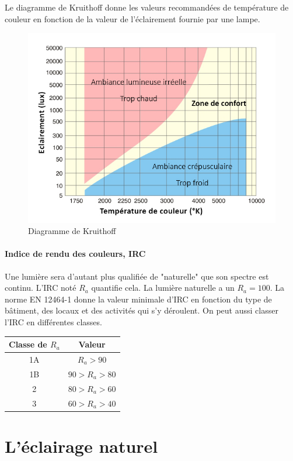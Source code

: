 \documentclass[11pt]{report}
\begin{document}
Le diagramme de Kruithoff donne les valeurs recommandées de température de couleur en fonction de la valeur de l'éclairement fournie par une lampe.


\begin{figure}[h]
\centering
\includegraphics[width=0.4\linewidth]{krui}
\caption{Diagramme de Kruithoff}
\end{figure}

\subsubsection{Indice de rendu des couleurs, IRC}
\label{irc}
Une lumière sera d'autant plus qualifiée de "naturelle" que son spectre est continu. L'IRC noté $R_a$ quantifie cela. La lumière naturelle a un $R_a=100$. La norme EN 12464-1 donne la valeur minimale d'IRC en fonction du type de bâtiment, des locaux et des activités qui s'y déroulent. On peut aussi classer l'IRC en différentes classes.

\begin{center}
\begin{tabular}{cc}
\textbf{Classe de $R_a$} & \textbf{Valeur}\\
\hline
1A & $R_a > 90$\\
1B & $90 > R_a > 80$\\
2 & $80 > R_a > 60$\\
3 & $60 > R_a > 40$\\
\end{tabular}
\end{center}















\chapter{L'éclairage naturel}
\end{document}
